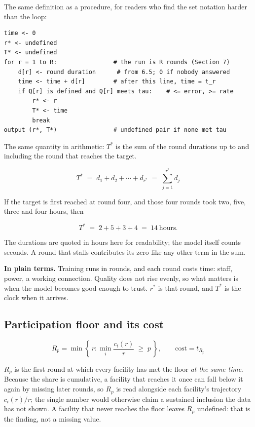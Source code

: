 \noindent
The same definition as a procedure, for readers who find the set notation harder than the loop:

{\small
\begin{verbatim}
time <- 0
r* <- undefined
T* <- undefined
for r = 1 to R:                # the run is R rounds (Section 7)
    d[r] <- round duration      # from 6.5; 0 if nobody answered
    time <- time + d[r]        # after this line, time = t_r
    if Q[r] is defined and Q[r] meets tau:    # <= error, >= rate
        r* <- r
        T* <- time
        break
output (r*, T*)                # undefined pair if none met tau
\end{verbatim}
}

\noindent
The same quantity in arithmetic: $T^{*}$ is the sum of the round durations up to and including
the round that reaches the target.

\begin{equation}
T^{*} \;=\; d_1 + d_2 + \cdots + d_{r^{*}} \;=\; \sum_{j=1}^{r^{*}} d_j
\label{eq:tstar-sum}
\end{equation}

\noindent
If the target is first reached at round four, and those four rounds took two, five, three and
four hours, then

\[
T^{*} \;=\; 2 + 5 + 3 + 4 \;=\; 14\ \text{hours}.
\]

\noindent
The durations are quoted in hours here for readability; the model itself counts seconds. A round
that stalls contributes its zero like any other term in the sum.

\noindent\textbf{In plain terms.} Training runs in rounds, and each round costs time: staff, power,
a working connection. Quality does not rise evenly, so what matters is when the model becomes good
enough to trust. $r^{*}$ is that round, and $T^{*}$ is the clock when it arrives.

\subsection{Participation floor and its cost}

\begin{equation}
R_p = \min\left\{\, r : \min_i \frac{c_i(r)}{r} \;\ge\; p \,\right\},
\qquad \text{cost} = t_{R_p}
\label{eq:rfloor}
\end{equation}

\noindent
$R_p$ is the first round at which every facility has met the floor \emph{at the same time}.
Because the share is cumulative, a facility that reaches it once can fall below it again by
missing later rounds, so $R_p$ is read alongside each facility's trajectory $c_i(r)/r$; the
single number would otherwise claim a sustained inclusion the data has not shown. A facility that
never reaches the floor leaves $R_p$ undefined: that is the finding, not a missing value.

